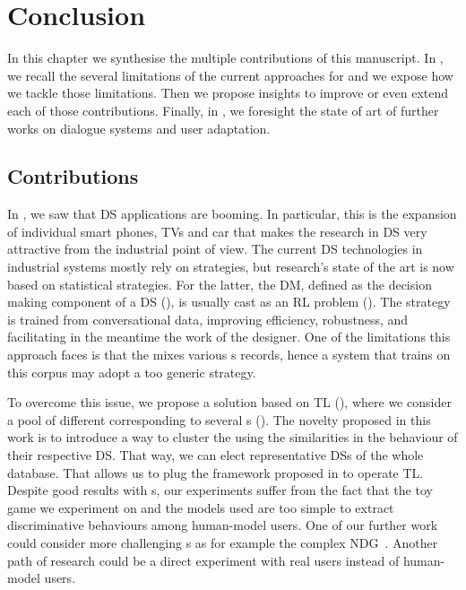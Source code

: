 \chapter{Conclusion}
\label{chapter:conclusion}

In this chapter we synthesise the multiple contributions of this manuscript. In , we recall the several limitations of the current approaches for   and we expose how we tackle those limitations. Then we propose insights to improve or even extend each of those contributions. Finally, in , we foresight the state of art of further works on dialogue systems and user adaptation.

\section{Contributions}
\label{sec:contribs}

In , we saw that \gls{DS} applications are booming. In particular, this is the expansion of individual smart phones, TVs and car that makes the research in \gls{DS} very attractive from the industrial point of view. 
The current \gls{DS} technologies in industrial systems mostly rely on  strategies, but research's state of the art is now based on statistical strategies. For the latter, the \acrfull{DM}, defined as the decision making component of a \gls{DS} (), is usually cast as an \acrfull{RL} problem (). The strategy is trained from conversational data, improving efficiency, robustness, and facilitating in the meantime the work of the designer. One of the limitations this approach faces is that the  mixes various s records, hence a system that trains on this corpus may adopt a too generic strategy.

To overcome this issue, we propose a solution based on \acrfull{TL} (), where we consider a pool of different  corresponding to several s (). The novelty proposed in this work is to introduce a way to cluster the  using the similarities in the behaviour of their respective \gls{DS}. That way, we can elect representative \glspl{DS} of the whole database. That allows us to plug the  framework proposed in \textcite{Genevay2016} to operate  \gls{TL}. Despite good results with s, our experiments suffer from the fact that the toy game we experiment on and the models used are too simple to extract discriminative behaviours among human-model users. One of our further work could consider more challenging s as for example the complex \acrlong{NDG}~\parencite{laroche2017ndg}. Another path of research could be a direct experiment with real users instead of human-model users.


